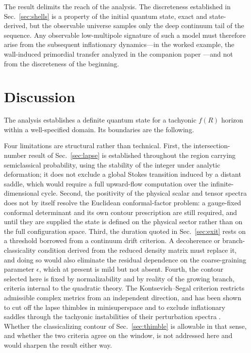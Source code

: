 \documentclass[aps,prd,twocolumn,superscriptaddress,nofootinbib,longbibliography]{revtex4-2}
\begin{document}
The result delimits the reach of the analysis. The discreteness
established in
Sec.~\ref{sec:shells} is a property of the initial quantum state, exact and
state-derived, but the observable universe samples only the deep continuum
tail of the sequence. Any observable low-multipole signature of such a model
must therefore arise from the subsequent inflationary dynamics---in the
worked example, the wall-induced primordial transfer analyzed in the
companion paper \cite{PandevI}---and not from the discreteness of the
beginning.

\section{Discussion}
\label{sec:discussion}
The analysis establishes a definite quantum state for a tachyonic $f(R)$
horizon within a well-specified domain. Its boundaries are the
following.

Four limitations are structural rather than technical. First, the
intersection-number result of Sec.~\ref{sec:lapse} is established throughout
the region carrying semiclassical probability, using the stability of the
integer under analytic deformation; it does not exclude a global Stokes
transition induced by a distant saddle, which would require a full
upward-flow computation over the infinite-dimensional cycle. Second, the
positivity of the physical scalar and tensor spectra does not by itself
resolve the Euclidean conformal-factor problem: a gauge-fixed conformal
determinant and its own contour prescription are still required, and until
they are supplied the state is defined on the physical sector rather than on
the full configuration space. Third, the duration quoted in
Sec.~\ref{sec:exit} rests on a threshold borrowed from a continuum
drift criterion. A decoherence or branch-classicality condition derived from
the reduced density matrix must replace it, and doing so would also
eliminate the residual dependence on the coarse-graining parameter
$\epsilon$, which at present is mild but not absent. Fourth, the contour
selected here is fixed by normalizability and by reality of the growing
branch, criteria internal to the quadratic theory. The
Kontsevich--Segal criterion \cite{Witten2021} restricts admissible complex
metrics from an independent direction, and has been shown to cut off the
lapse thimbles in minisuperspace \cite{Lehners2022} and to exclude
inflationary saddles through the tachyonic instabilities of their
perturbation spectra \cite{HertogJanssenKarlsson2023}. Whether the
classicalizing contour of Sec.~\ref{sec:thimble} is allowable in that
sense, and whether the two criteria agree on the window, is not addressed
here and would sharpen the result either way.
\end{document}
